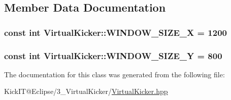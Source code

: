\subsection{Member Data Documentation}
\subsubsection[{\texorpdfstring{W\+I\+N\+D\+O\+W\+\_\+\+S\+I\+Z\+E\+\_\+X}{WINDOW_SIZE_X}}]{\setlength{\rightskip}{0pt plus 5cm}const int Virtual\+Kicker\+::\+W\+I\+N\+D\+O\+W\+\_\+\+S\+I\+Z\+E\+\_\+X = 1200\hspace{0.3cm}{\ttfamily [static]}}\hypertarget{class_virtual_kicker_ab00ead9976b5ea4269238403772a0205}{}\label{class_virtual_kicker_ab00ead9976b5ea4269238403772a0205}
\subsubsection[{\texorpdfstring{W\+I\+N\+D\+O\+W\+\_\+\+S\+I\+Z\+E\+\_\+Y}{WINDOW_SIZE_Y}}]{\setlength{\rightskip}{0pt plus 5cm}const int Virtual\+Kicker\+::\+W\+I\+N\+D\+O\+W\+\_\+\+S\+I\+Z\+E\+\_\+Y = 800\hspace{0.3cm}{\ttfamily [static]}}\hypertarget{class_virtual_kicker_a3fb0d845e01a7424ac7a37f4299875ad}{}\label{class_virtual_kicker_a3fb0d845e01a7424ac7a37f4299875ad}


The documentation for this class was generated from the following file\+:\begin{DoxyCompactItemize}
\item 
Kick\+I\+T@\+Eclipse/3\+\_\+\+Virtual\+Kicker/\hyperlink{_virtual_kicker_8hpp}{Virtual\+Kicker.\+hpp}\end{DoxyCompactItemize}
